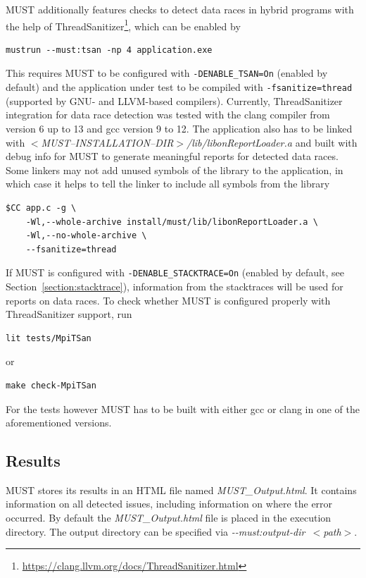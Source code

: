 \documentclass[english]{scrartcl}
\begin{document}
MUST additionally features checks to detect data races in hybrid programs with the help of ThreadSanitizer\footnote{\url{https://clang.llvm.org/docs/ThreadSanitizer.html}}, which can be enabled by
\begin{verbatim}
mustrun --must:tsan -np 4 application.exe
\end{verbatim}
This requires MUST to be configured with \verb|-DENABLE_TSAN=On| (enabled by default) and the application under test to be compiled with \verb|-fsanitize=thread| (supported by GNU- and LLVM-based compilers).
Currently, ThreadSanitizer integration for data race detection was tested with the clang compiler from version 6 up to 13 and gcc version 9 to 12.
The application also has to be linked with \emph{$<$MUST\mbox{--}INSTALLATION\mbox{--}DIR$>$/lib/libonReportLoader.a} and built with debug info for MUST to generate meaningful reports for detected data races.
Some linkers may not add unused symbols of the library to the application, in which case it helps to tell the linker to include all symbols from the library
\begin{verbatim}
$CC app.c -g \
    -Wl,--whole-archive install/must/lib/libonReportLoader.a \
    -Wl,--no-whole-archive \
    --fsanitize=thread
\end{verbatim}

If MUST is configured with \verb|-DENABLE_STACKTRACE=On| (enabled by default, see Section~\ref{section:stacktrace}), information from the stacktraces will be used for reports on data races.
To check whether MUST is configured properly with ThreadSanitizer support, run
\begin{verbatim}
lit tests/MpiTSan
\end{verbatim}
or
\begin{verbatim}
make check-MpiTSan
\end{verbatim}
For the tests however MUST has to be built with either gcc or clang in one of the aforementioned versions.

\subsection{Results}
MUST stores its results in an HTML file named \emph{MUST\_Output.html}. It
contains information on all detected issues, including information on where the
error occurred.
By default the \emph{MUST\_Output.html} file is placed in the execution directory.
The output directory can be specified via \mbox{\emph{\mbox{-{}-must:output-dir $<$path$>$}}}.
\end{document}
